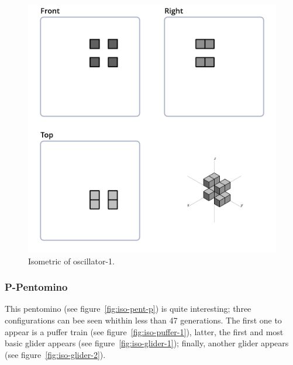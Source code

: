 \begin{figure}
	\centering
	\includegraphics[scale=0.3]{iso_settings/osc_1.png}
	\caption{Isometric of oscillator-1.}
  \label{fig:iso-osc-1}
\end{figure}

\subsubsection{P-Pentomino}
This pentomino (see figure~\ref{fig:iso-pent-p}) is quite interesting; three
configurations can bee seen whithin less than 47 generations. The first one to
appear is a puffer train (see figure~\ref{fig:iso-puffer-1}), latter, the first
and most basic glider appears (see figure~\ref{fig:iso-glider-1}); finally,
another glider appears (see figure~\ref{fig:iso-glider-2}).

